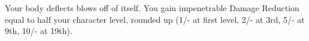 \shortfeat
{Your body deflects blows off of itself.}
{You gain impenetrable Damage Reduction equal to half your character level, rounded up (1/- at first level, 2/- at 3rd, 5/- at 9th, 10/- at 19th).}


